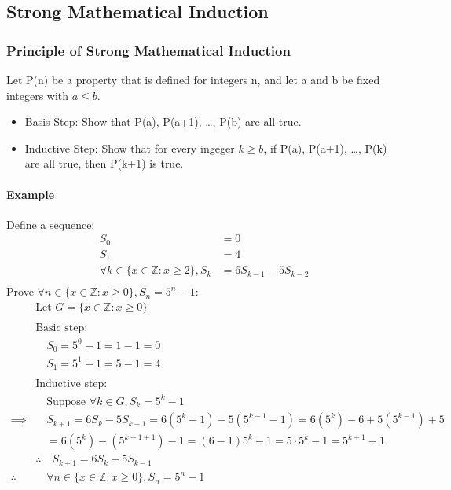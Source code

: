 \subsection{Strong Mathematical Induction}
\hrulefill

\subsubsection*{Principle of Strong Mathematical Induction}
Let P(n) be a property that is defined for integers n, and let a and b be fixed integers with $a \leq b$.
\begin{itemize}
    \item Basis Step: Show that P(a), P(a+1), \dots, P(b) are all true.
    \item Inductive Step: Show that for every ingeger $k \geq b$, if P(a), P(a+1), \dots, P(k) are all true, then P(k+1) is true.
\end{itemize}

\paragraph*{Example}
Define a sequence:
\begin{align*}
    S_0 &= 0\\
    S_1 &= 4\\
    \forall k \in \{x \in \mathbb{Z} : x \geq 2\}, S_k &= 6S_{k-1} - 5S_{k-2}\\
\end{align*}
Prove $\forall n \in \{x \in \mathbb{Z} : x \geq 0\}, S_n = 5^n - 1$:
\begin{align*}
    &\text{Let } G = \{x \in \mathbb{Z} : x \geq 0\}\\
    \\
    &\text{Basic step:}\\
    &\quad S_0 = 5^0 - 1 = 1 - 1 = 0\\
    &\quad S_1 = 5^1 - 1 = 5 - 1 = 4\\
    \\
    &\text{Inductive step:}\\
    &\quad \text{Suppose } \forall k \in G, S_k = 5^k - 1\\
    \implies& \quad S_{k+1} = 6S_k - 5S_{k-1} = 6(5^k-1) - 5(5^{k-1}-1) = 6(5^k) - 6 + 5(5^{k-1}) + 5\\
    &\quad = 6(5^k) - (5^{k-1+1}) - 1 = (6-1)5^k - 1 = 5 \cdot 5^k - 1 = 5^{k+1} - 1\\
    &\therefore \quad S_{k+1} = 6S_k - 5S_{k-1}\\
    \therefore &\quad \forall n \in \{x \in \mathbb{Z} : x \geq 0\}, S_n = 5^n - 1
\end{align*}

